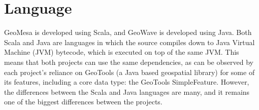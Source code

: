 \section{Language}
\label{sec:featurecompare:language}

GeoMesa is developed using Scala, and GeoWave is developed using Java.
Both Scala and Java are languages in which the source compiles down to Java Virtual Machine (JVM) bytecode, which is executed on top of the same JVM.
This means that both projects can use the same dependencies, as can be observed by each project's reliance on GeoTools (a Java based geospatial library) for some of its features, including a core data type: the GeoTools SimpleFeature.
However, the differences between the Scala and Java languages are many, and it remains one of the biggest differences between the projects.

